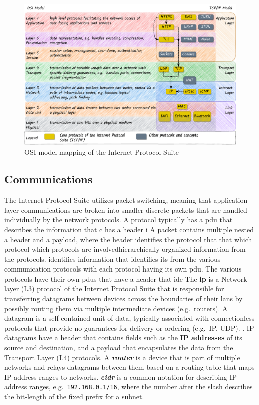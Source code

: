\begin{figure}
\centering
\includegraphics[width=1\textwidth,height=\textheight]{thesis/../figures/osi-map-tcp.drawio.pdf}
\caption{OSI model mapping of the Internet Protocol
Suite\label{osi-map-tcp}}
\end{figure}

\hypertarget{communications}{%
\subsection{Communications}\label{communications}}

The Internet Protocol Suite utilizes packet-switching, meaning that
application layer communications are broken into smaller discrete
packets that are handled individually by the network protocols. A
protocol typically has a \gls{pdu} that describes the information that c
has a header i A packet contains multiple nested a header and a payload,
where the header identifies the protocol that that which protocol which
protocols are involvedhierarchically organized information from the
protocols. identifies information that identifies its from the various
communication protocols with each protocol having its own \gls{pdu}. The
various protocols have their own \glspl{pdu} that have a header that ide
The \textbf{\acrfull{ip}} \autocite{ipv4RFC} is a Network layer (L3)
protocol of the Internet Protocol Suite that is responsible for
transferring datagrams between devices across the boundaries of their
\glspl{lan} by possibly routing them via multiple intermediate devices
(e.g.~routers). A datagram is a self-contained unit of data, typically
associated with connectionless protocols that provide no guarantees for
delivery or ordering (e.g.~IP, UDP).
. IP datagrams
have a header that contains fields such as the \textbf{IP addresses} of
its source and destination, and a
payload that encapsulates the data from the Transport Layer (L4)
protocols. A \textbf{\emph{router}} is a device that is part of multiple
networks and relays datagrams between them based on a routing table that
maps IP address ranges to networks. \textbf{\emph{\gls{cidr}}} is a
common notation for describing IP address ranges,
e.g.~\texttt{192.168.0.1/16}, where the number after the slash describes
the bit-length of the fixed prefix for a subnet.

